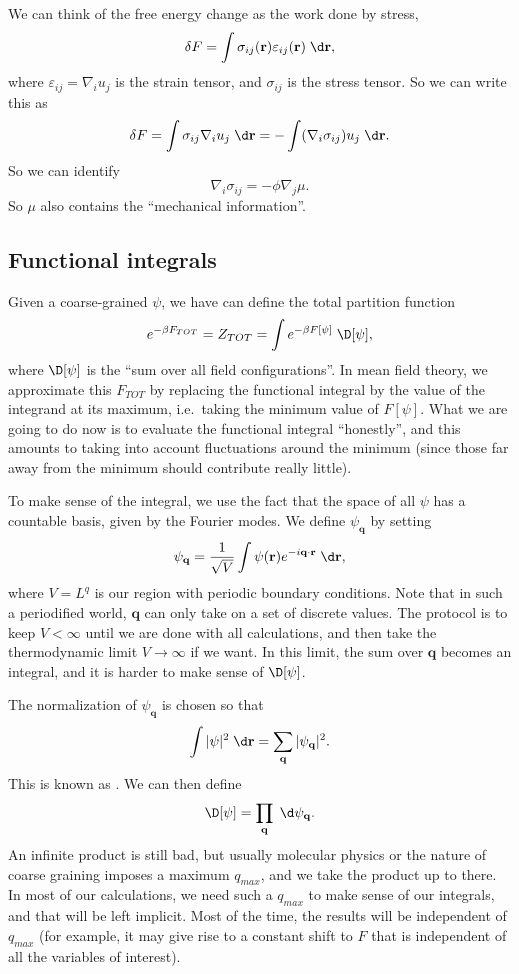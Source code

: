 \documentclass[a4paper]{article}
\begin{document}
We can think of the free energy change as the work done by stress,
\[
  \delta F = \int \sigma_{ij}(\mathbf{r}) \varepsilon_{ij}(\mathbf{r})\;\d \mathbf{r},
\]
where $\varepsilon_{ij} = \nabla_i u_j$ is the strain tensor, and $\sigma_{ij}$ is the stress tensor. So we can write this as
\[
  \delta F = \int \sigma_{ij} \nabla_i u_j\;\d \mathbf{r} = - \int (\nabla_i \sigma_{ij}) u_j\;\d \mathbf{r}.
\]
So we can identify
\[
  \nabla_i \sigma_{ij} = -\phi \nabla_j \mu.
\]
So $\mu$ also contains the ``mechanical information''.

\subsection{Functional integrals}
Given a coarse-grained $\psi$, we have can define the total partition function
\[
  e^{-\beta F_{TOT}} = Z_{TOT} = \int e^{-\beta F[\psi]} \;\D [\psi],
\]
where $\D [\psi]$ is the ``sum over all field configurations''. In mean field theory, we approximate this $F_{TOT}$ by replacing the functional integral by the value of the integrand at its maximum, i.e.\ taking the minimum value of $F[\psi]$. What we are going to do now is to evaluate the functional integral ``honestly'', and this amounts to taking into account fluctuations around the minimum (since those far away from the minimum should contribute really little).

To make sense of the integral, we use the fact that the space of all $\psi$ has a countable basis, given by the Fourier modes. We define $\psi_\mathbf{q}$ by setting
\[
  \psi_\mathbf{q} = \frac{1}{\sqrt{V}} \int \psi(\mathbf{r}) e^{-i\mathbf{q}\cdot \mathbf{r}}\;\d \mathbf{r},
\]
where $V = L^q$ is our region with periodic boundary conditions. Note that in such a periodified world, $\mathbf{q}$ can only take on a set of discrete values. The protocol is to keep $V < \infty$ until we are done with all calculations, and then take the thermodynamic limit $V \to \infty$ if we want. In this limit, the sum over $\mathbf{q}$ becomes an integral, and it is harder to make sense of $\D[\psi]$.

The normalization of $\psi_\mathbf{q}$ is chosen so that
\[
  \int |\psi|^2 \;\d \mathbf{r} = \sum_{\mathbf{q} } |\psi_\mathbf{q}|^2.
\]
This is known as . We can then define
\[
  \D [\psi] = \prod_{\mathbf{q}} \;\d \psi_\mathbf{q}.
\]
An infinite product is still bad, but usually molecular physics or the nature of coarse graining imposes a maximum $q_{max}$, and we take the product up to there. In most of our calculations, we need such a $q_{max}$ to make sense of our integrals, and that will be left implicit. Most of the time, the results will be independent of $q_{max}$ (for example, it may give rise to a constant shift to $F$ that is independent of all the variables of interest).
\end{document}
